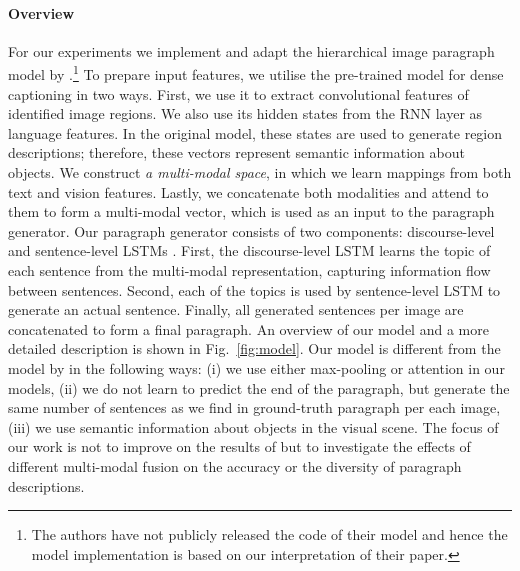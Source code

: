 \documentclass[11pt,a4paper]{article}
\begin{document}
\paragraph{Overview}
For our experiments we implement and adapt the hierarchical image paragraph model by \citet{krause2016hierarchical}.\footnote{The authors have not publicly released the code of their model and hence the model implementation is based on our interpretation of their paper.}
To prepare input features, we utilise the pre-trained model for dense captioning \cite{densecap} in two ways.
First, we use it to extract convolutional features of identified image regions.
We also use its hidden states from the RNN layer as language features.
In the original model, these states are used to generate region descriptions; therefore, these vectors represent semantic information about objects.
We construct \textit{a multi-modal space}, in which we learn mappings from both text and vision features.
Lastly, we concatenate both modalities and attend to them to form a multi-modal vector, which is used as an input to the paragraph generator.
Our paragraph generator consists of two components: discourse-level and sentence-level LSTMs \cite{lstm97}.
First, the discourse-level LSTM learns the topic of each sentence from the multi-modal representation, capturing information flow between sentences.
Second, each of the topics is used by sentence-level LSTM to generate an actual sentence.
Finally, all generated sentences per image are concatenated to form a final paragraph.
An overview of our model and a more detailed description is shown in Fig.~\ref{fig:model}.
Our model is different from the model by  in the following ways: (i) we use either max-pooling or attention in our models, (ii) we do not learn to predict the end of the paragraph, but generate the same number of sentences as we find in ground-truth paragraph per each image, (iii) we use semantic information about objects in the visual scene.
The focus of our work is not to improve on the results of  but to investigate the effects of different multi-modal fusion on the accuracy or the diversity of paragraph descriptions. %
\end{document}
